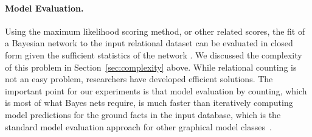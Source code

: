 \documentclass[runningheads,a4paper]{llncs}
\begin{document}
\paragraph{Model Evaluation.} Using the maximum likelihood scoring method, or other related scores, the fit of a Bayesian network to the input relational dataset can be evaluated in closed form given the sufficient statistics of the network \cite{Friedman99prm,Schulte2011}.  
We discussed the complexity of this problem in Section~\ref{sec:complexity} above. While relational counting is not an easy problem, researchers have developed efficient solutions. The important point for our experiments is that model evaluation by counting, which is most of what Bayes nets require, is much faster than   iteratively computing model predictions for the ground facts in the input database, which is the standard model evaluation approach for other graphical model classes~\cite[Sec.8.5.1]{Neville2007}. 
\end{document}
